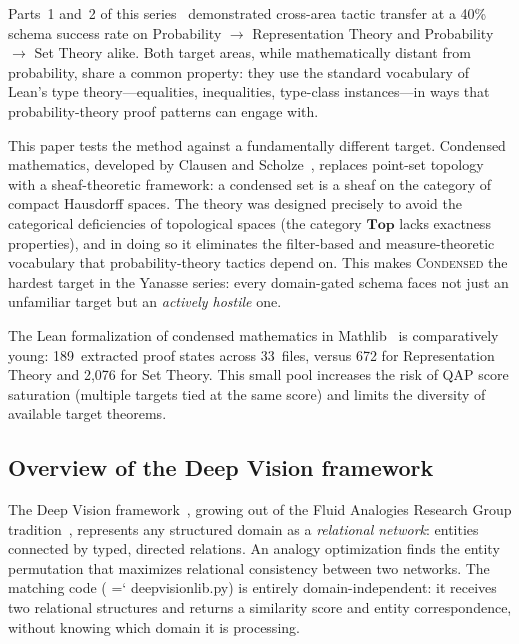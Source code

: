 \documentclass[11pt]{article}
\renewcommand{\texttt}[1]{%
  \begingroup\ttfamily\hyphenchar\font=`\-\relax
  \def\_{\textunderscore\discretionary{}{}{}}%
  #1\endgroup}
\theoremstyle{definition}
\theoremstyle{remark}
\begin{document}
Parts~1 and~2 of this series~\cite{yanasse_part1, yanasse_part2}
demonstrated cross-area tactic transfer at a 40\% schema success
rate on Probability $\to$ Representation Theory and Probability
$\to$ Set Theory alike.  Both target areas, while
mathematically distant from probability, share a common property:
they use the standard vocabulary of Lean's type theory---equalities,
inequalities, type-class instances---in ways that probability-theory
proof patterns can engage with.

This paper tests the method against a fundamentally different
target.  Condensed mathematics, developed by Clausen and
Scholze~\cite{scholze_condensed_2019, clausen_scholze_complex_2022},
replaces point-set topology with a sheaf-theoretic framework: a
condensed set is a sheaf on the category of compact Hausdorff
spaces.  The theory was designed precisely to avoid the categorical
deficiencies of topological spaces (the category $\mathbf{Top}$
lacks exactness properties), and in doing so it eliminates the
filter-based and measure-theoretic vocabulary that probability-theory
tactics depend on.  This makes \textsc{Condensed} the hardest
target in the Yanasse series: every domain-gated schema faces not
just an unfamiliar target but an \emph{actively hostile} one.

The Lean formalization of condensed mathematics in
Mathlib~\cite{asgeirsson_condensed_2024, asgeirsson_discrete_2024}
is comparatively young: 189~extracted proof states across 33~files,
versus 672 for Representation Theory and 2{,}076 for Set Theory.
This small pool increases the risk of QAP score saturation (multiple
targets tied at the same score) and limits the diversity of available
target theorems.

\subsection{Overview of the Deep Vision framework}

The Deep Vision framework~\cite{linhares_deep_vision,
linhares2024deepvision}, growing out of the Fluid Analogies Research
Group tradition~\cite{hofstadter_fluid_1995, hofstadter_go_1999,
hofstadter_surfaces_2013}, represents any structured domain as a
\emph{relational network}: entities connected by typed, directed
relations.  An analogy optimization finds the entity permutation that
maximizes relational consistency between two networks.  The matching
code (\texttt{deep\_vision\_lib.py}) is entirely domain-independent:
it receives two relational structures and returns a similarity score
and entity correspondence, without knowing which domain it is
processing.
\end{document}
